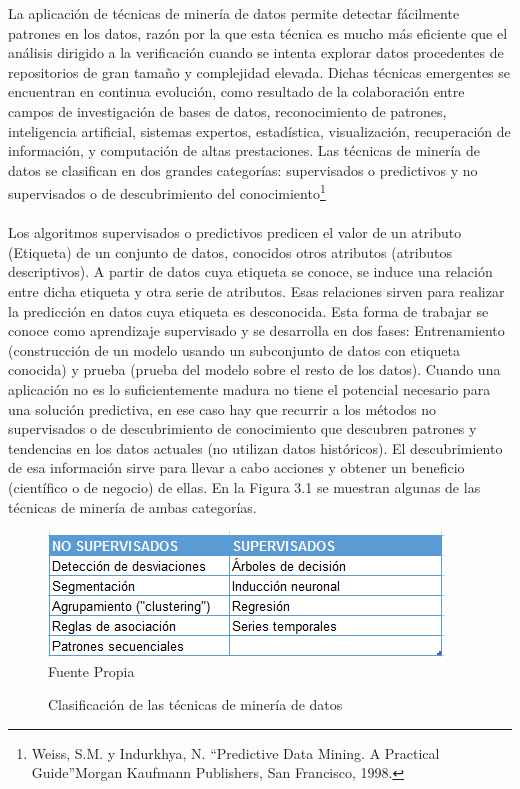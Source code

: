 \documentclass[a4paper,openright,12pt]{book}
\theoremstyle{definition}
\theoremstyle{remark}
\begin{document}
La aplicación de técnicas de minería de datos permite detectar fácilmente patrones en los datos, razón por la que esta técnica es mucho más eficiente que el análisis dirigido a la verificación cuando se intenta explorar datos procedentes de repositorios de gran tamaño y complejidad elevada. Dichas técnicas emergentes se encuentran en continua evolución, como resultado de la colaboración entre campos de investigación de bases de datos, reconocimiento de patrones, inteligencia artificial, sistemas expertos, estadística, visualización, recuperación de información, y computación de altas prestaciones. Las técnicas de minería de datos se clasifican en dos grandes categorías: supervisados o predictivos y no supervisados o de descubrimiento del conocimiento\footnote{Weiss, S.M. y Indurkhya, N. “Predictive Data Mining. A Practical Guide”Morgan Kaufmann Publishers, San Francisco, 1998.}\\\\
Los algoritmos supervisados o predictivos predicen el valor de un atributo (Etiqueta) de un conjunto de datos, conocidos otros atributos (atributos descriptivos). A partir de datos cuya etiqueta se conoce, se induce una relación entre dicha etiqueta y otra serie de atributos. Esas relaciones sirven para realizar la predicción en datos cuya etiqueta es desconocida. Esta forma de trabajar se conoce como aprendizaje supervisado y se desarrolla en dos fases: Entrenamiento (construcción de un modelo usando un subconjunto de datos con etiqueta conocida) y prueba (prueba del modelo sobre el resto de los datos). Cuando una aplicación no es lo suficientemente madura no tiene el potencial necesario para una solución predictiva, en ese caso hay que recurrir a los métodos no supervisados o de descubrimiento de  conocimiento que descubren patrones y tendencias en los datos actuales (no utilizan datos históricos). El descubrimiento de esa información sirve para llevar a cabo acciones y obtener un beneficio (científico o de negocio) de ellas. En la Figura 3.1 se muestran algunas de las técnicas de minería de ambas categorías.

\begin{figure}[h]
\centering
\caption{Clasificación de las técnicas de minería de datos} 
\includegraphics[scale=0.8]{Tabla1}
\label{fig:Tabla1}
\\Fuente Propia
\end{figure}
\end{document}
